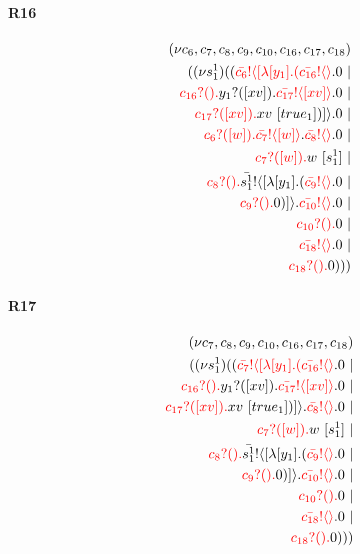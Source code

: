 \documentclass{article}
\begin{document}
\paragraph{R16}
\begin{align*}
 (\nu c_{6},c_{7},c_{8},c_{9},c_{10},c_{16},c_{17},c_{18}) \\ ( (\nu s^{1}_{1})((\color{red}\bar{c_{6}}! \langle [ \lambda [y_{1}].(\color{red}\bar{c_{16}}! \langle  \rangle \color{black}.0  \ | \\ \color{red}c_{16}?().\color{black}\color{black}y_{1}?([xv]).\color{black}\color{red}\bar{c_{17}}! \langle [xv] \rangle \color{black}.0  \ | \\ \color{red}c_{17}?([xv]).\color{black}xv \ [true_{1}])] \rangle \color{black}.0  \ | \\ \color{red}c_{6}?([w]).\color{black}\color{red}\bar{c_{7}}! \langle [w] \rangle \color{black}.\color{red}\bar{c_{8}}! \langle  \rangle \color{black}.0  \ | \\ \color{red}c_{7}?([w]).\color{black}w \ [s^{1}_{1}] \ | \\ \color{red}c_{8}?().\color{black}\color{black}\bar{s^{1}_{1}}! \langle [ \lambda [y_{1}].(\color{red}\bar{c_{9}}! \langle  \rangle \color{black}.0  \ | \\ \color{red}c_{9}?().\color{black}0 )] \rangle \color{black}.\color{red}\bar{c_{10}}! \langle  \rangle \color{black}.0  \ | \\ \color{red}c_{10}?().\color{black}0  \ | \\ \color{red}\bar{c_{18}}! \langle  \rangle \color{black}.0  \ | \\ \color{red}c_{18}?().\color{black}0 )))
\end{align*}
\paragraph{R17}
\begin{align*}
 (\nu c_{7},c_{8},c_{9},c_{10},c_{16},c_{17},c_{18}) \\ ( (\nu s^{1}_{1})((\color{red}\bar{c_{7}}! \langle [ \lambda [y_{1}].(\color{red}\bar{c_{16}}! \langle  \rangle \color{black}.0  \ | \\ \color{red}c_{16}?().\color{black}\color{black}y_{1}?([xv]).\color{black}\color{red}\bar{c_{17}}! \langle [xv] \rangle \color{black}.0  \ | \\ \color{red}c_{17}?([xv]).\color{black}xv \ [true_{1}])] \rangle \color{black}.\color{red}\bar{c_{8}}! \langle  \rangle \color{black}.0  \ | \\ \color{red}c_{7}?([w]).\color{black}w \ [s^{1}_{1}] \ | \\ \color{red}c_{8}?().\color{black}\color{black}\bar{s^{1}_{1}}! \langle [ \lambda [y_{1}].(\color{red}\bar{c_{9}}! \langle  \rangle \color{black}.0  \ | \\ \color{red}c_{9}?().\color{black}0 )] \rangle \color{black}.\color{red}\bar{c_{10}}! \langle  \rangle \color{black}.0  \ | \\ \color{red}c_{10}?().\color{black}0  \ | \\ \color{red}\bar{c_{18}}! \langle  \rangle \color{black}.0  \ | \\ \color{red}c_{18}?().\color{black}0 )))
\end{align*}
\end{document}
